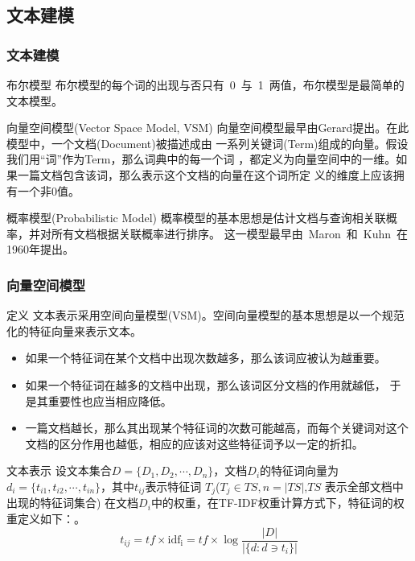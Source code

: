 \documentclass[CJKutf8, table]{beamer}
\begin{document}
\begin{CJK}{UTF8}{gbsn}
\subsection{文本建模}
\begin{frame}
  \frametitle{文本建模}
  \begin{small}
  \begin{block}{布尔模型}
    布尔模型的每个词的出现与否只有~0~与~1~两值，布尔模型是最简单的文本模型。
  \end{block}
  \pause
  \begin{block}{向量空间模型(Vector Space Model, VSM)}
    向量空间模型最早由Gerard提出\cite{Salton}。在此模型中，一个文档(Document)被描述成由
    一系列关键词(Term)组成的向量。假设我们用``词''作为Term，那么词典中的每一个词
    ，都定义为向量空间中的一维。如果一篇文档包含该词，那么表示这个文档的向量在这个词所定
    义的维度上应该拥有一个非0值。
  \end{block}
  \pause
  \begin{block}{概率模型(Probabilistic Model)}
    概率模型的基本思想是估计文档与查询相关联概率，并对所有文档根据关联概率进行排序。
    这一模型最早由~Maron~和~Kuhn~在1960年提出。
  \end{block}
\end{small}
\end{frame}

\begin{frame}
  \frametitle{向量空间模型\cite{Wikipedia-IR}}
  \begin{tiny}
    \begin{block}{定义}
      文本表示采用空间向量模型(VSM)。空间向量模型的基本思想是以一个规范化的特征向量来表示文本。
      \begin{itemize}
          \pause
          \item{如果一个特征词在某个文档中出现次数越多，那么该词应被认为越重要。}
          \pause
          \item{如果一个特征词在越多的文档中出现，那么该词区分文档的作用就越低，
            于是其重要性也应当相应降低。}
          \pause
          \item{一篇文档越长，那么其出现某个特征词的次数可能越高，而每个关键词对这个
            文档的区分作用也越低，相应的应该对这些特征词予以一定的折扣。}
        \end{itemize}
    \end{block}
  \end{tiny}
  \pause
  \begin{tiny}
    \begin{block}{文本表示}
      设文本集合$D = \{D_1, D_2, \cdots, D_n\}$，文档$D_i$的特征词向量为
      $d_i = \{t_{i1}, t_{i2}, \cdots, t_{in}\}$，其中$t_{ij}$表示特征词
      $T_j$($T_j \in TS, n = \vert TS \vert$,$TS$ 表示全部文档中出现的特征词集合)
      在文档$D_i$中的权重，在TF-IDF权重计算方式下，特征词的权重定义如下：。
      \pause
      $$
      t_{ij} = tf \times \mathrm{idf_i} = tf \times \log \frac{|D|}{|\{d: d \ni t_{i}\}|}
      $$
    \end{block}
  \end{tiny}
\end{frame}


\end{CJK}
\end{document}
